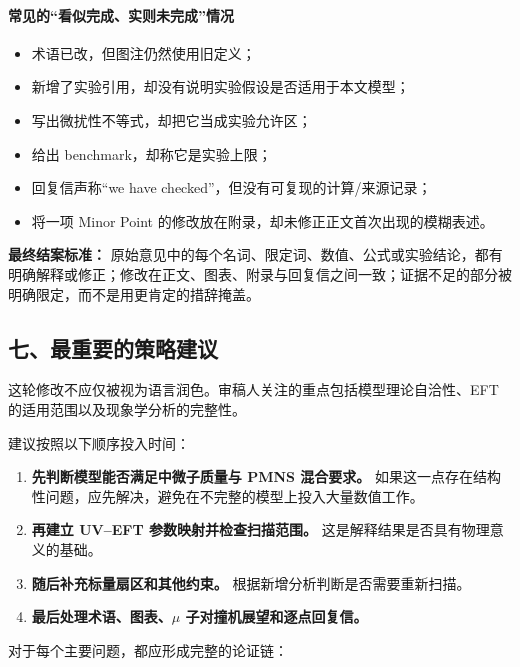 \documentclass[
  chinese,
  UTF8]{ctexart}
\providecommand{\tightlist}{%
  \setlength{\itemsep}{0pt}\setlength{\parskip}{0pt}}
\begin{document}
\paragraph{常见的``看似完成、实则未完成''情况}\label{ux5e38ux89c1ux7684ux770bux4f3cux5b8cux6210ux5b9eux5219ux672aux5b8cux6210ux60c5ux51b5}

\begin{itemize}
\tightlist
\item
  术语已改，但图注仍然使用旧定义；
\item
  新增了实验引用，却没有说明实验假设是否适用于本文模型；
\item
  写出微扰性不等式，却把它当成实验允许区；
\item
  给出 benchmark，却称它是实验上限；
\item
  回复信声称``we have checked''，但没有可复现的计算/来源记录；
\item
  将一项 Minor Point 的修改放在附录，却未修正正文首次出现的模糊表述。
\end{itemize}

\textbf{最终结案标准：}
原始意见中的每个名词、限定词、数值、公式或实验结论，都有明确解释或修正；修改在正文、图表、附录与回复信之间一致；证据不足的部分被明确限定，而不是用更肯定的措辞掩盖。

\subsection{七、最重要的策略建议}\label{ux4e03ux6700ux91cdux8981ux7684ux7b56ux7565ux5efaux8bae}

这轮修改不应仅被视为语言润色。审稿人关注的重点包括模型理论自洽性、EFT
的适用范围以及现象学分析的完整性。

建议按照以下顺序投入时间：

\begin{enumerate}
\def\labelenumi{\arabic{enumi}.}
\tightlist
\item
  \textbf{先判断模型能否满足中微子质量与 PMNS 混合要求。}
  如果这一点存在结构性问题，应先解决，避免在不完整的模型上投入大量数值工作。
\item
  \textbf{再建立 UV--EFT 参数映射并检查扫描范围。}
  这是解释结果是否具有物理意义的基础。
\item
  \textbf{随后补充标量扇区和其他约束。}
  根据新增分析判断是否需要重新扫描。
\item
  \textbf{最后处理术语、图表、\ensuremath{\mu}
  子对撞机展望和逐点回复信。}
\end{enumerate}

对于每个主要问题，都应形成完整的论证链：
\end{document}
